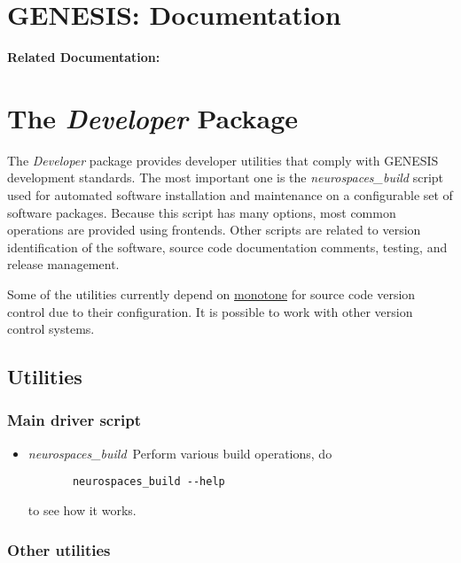 \documentclass[12pt]{article}
\begin{document}
\section*{GENESIS: Documentation}

{\bf Related Documentation:}

\section*{The {\it Developer} Package}

The {\it Developer} package provides developer utilities that comply
with GENESIS development standards. The most important one is the {\it
  neurospaces\_build} script used for automated software installation
and maintenance on a configurable set of software packages.  Because
this script has many options, most common operations are provided
using frontends.  Other scripts are related to version identification
of the software, source code documentation comments, testing, and
release management.

Some of the utilities currently depend on \href{http://monotone.ca}{monotone} for source code version control due to their configuration. It is possible to work with other version control systems.

\subsection*{Utilities}

\subsubsection*{Main driver script}

\begin{itemize}
	\item {\it neurospaces\_build}\,\,\,Perform various build operations, do 
	\begin{verbatim}
	   neurospaces_build --help
	\end{verbatim}
	   to see how it works. 
\end{itemize} 


\subsubsection*{Other utilities}
\end{document}
